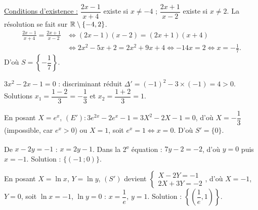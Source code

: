 \documentclass[11pt]{article}
\begin{document}
\begin{questions}
  \item \underline{Conditions d'existence :} $\dfrac{2x-1}{x+4}$ existe si $x \ne -4$ ; $\dfrac{2x+1}{x-2}$ existe si $x \ne 2$. La résolution se fait sur $\mathbb{R}\setminus\{-4, 2\}$.
  \begin{align*}
  \frac{2x-1}{x+4} = \frac{2x+1}{x-2} &\Longleftrightarrow (2x-1)(x-2) = (2x+1)(x+4) \\
  &\Longleftrightarrow 2x^2 - 5x + 2 = 2x^2 + 9x + 4 \Longleftrightarrow -14x = 2 \Longleftrightarrow x = -\frac{1}{7}.
  \end{align*}
  D'où $S = \left\{-\dfrac{1}{7}\right\}$.
  \item \begin{sousq}
    \item $3x^2 - 2x - 1 = 0$ : discriminant réduit $\Delta' = (-1)^2 - 3\times(-1) = 4 > 0$. Solutions $x_1 = \dfrac{1-2}{3} = -\dfrac{1}{3}$ et $x_2 = \dfrac{1+2}{3} = 1$.
    \item En posant $X = e^x$, $(E') : 3e^{2x} - 2e^x - 1 = 3X^2 - 2X - 1 = 0$, d'où $X = -\dfrac{1}{3}$ (impossible, car $e^x > 0$) ou $X = 1$, soit $e^x = 1 \Leftrightarrow x = 0$. D'où $S' = \{0\}$.
  \end{sousq}
  \item \begin{sousq}
    \item De $x - 2y = -1$ : $x = 2y - 1$. Dans la 2\textsuperscript{e} équation : $7y - 2 = -2$, d'où $y = 0$ puis $x = -1$. Solution : $\{(-1\,;0)\}$.
    \item En posant $X = \ln x$, $Y = \ln y$, $(S')$ devient $\begin{cases} X - 2Y = -1 \\ 2X + 3Y = -2 \end{cases}$, d'où $X = -1$, $Y = 0$, soit $\ln x = -1$, $\ln y = 0$ : $x = \dfrac{1}{e}$, $y = 1$. Solution : $\left\{\left(\dfrac{1}{e}, 1\right)\right\}$.
  \end{sousq}
\end{questions}
\end{document}
